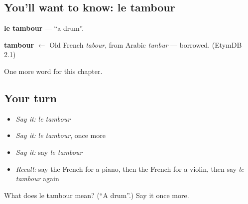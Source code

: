 \subsection*{You'll want to know: le tambour}
\textbf{le tambour} — \textquotedblleft{}a drum\textquotedblright{}.

\begin{cousinweb}
\textbf{tambour} $\leftarrow$ Old French \emph{tabour}, from Arabic \emph{tunbur} — borrowed. (EtymDB 2.1)
\end{cousinweb}

\begin{grammarlens}[title={What you've built}]
One more word for this chapter.
\end{grammarlens}

\subsection*{Your turn}
\begin{itemize}
\raggedright
  \item \emph{Say it:} \emph{le tambour}
  \item \emph{Say it:} \emph{le tambour}, once more
  \item \emph{Say it:} say \emph{le tambour}
  \item \emph{Recall:} say the French for a piano, then the French for a violin, then say \emph{le tambour} again
\end{itemize}

\begin{tcolorbox}[breakable,colback=teal!4,colframe=teal!35!black,title={Before you move on}]
What does le tambour mean? (\textquotedblleft{}A drum\textquotedblright{}.) Say it once more.
\end{tcolorbox}
